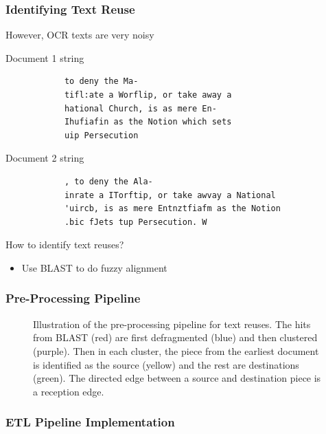 \documentclass[pdf]{beamer}
\begin{document}
\begin{frame}[fragile]
    \frametitle{Identifying Text Reuse}


        However, OCR texts are very noisy
        \begin{block}{\centering Document 1 string}
            \footnotesize
            \begin{verbatim}
            to deny the Ma-
            tifl:ate a Worflip, or take away a
            hational Church, is as mere En-
            Ihufiafin as the Notion which sets
            uip Persecution    
            \end{verbatim}
        \end{block}    
        \begin{block}{\centering Document 2 string}
            \footnotesize
            \begin{verbatim}
            , to deny the Ala-
            inrate a ITorftip, or take awvay a National
            'uircb, is as mere Entnztfiafm as the Notion
            .bic fJets tup Persecution. W
            \end{verbatim}
        \end{block}    
        How to identify text reuses?
        \begin{itemize}
            \item Use BLAST to do fuzzy alignment
        \end{itemize}
\end{frame}

\begin{frame}[fragile]
    \frametitle{Pre-Processing Pipeline}
    \begin{figure}[htbp]
        \centering
        \scalebox{0.5}{
        
        }
        \caption{Illustration of the pre-processing pipeline for text reuses. The hits from BLAST (red) are first defragmented (blue) and then clustered (purple). Then in each cluster, the piece from the earliest document is identified as the source (yellow) and the rest are destinations (green). The directed edge between a source and destination piece is a reception edge.}
    \end{figure}
\end{frame}

\begin{frame}
    \frametitle{ETL Pipeline Implementation}
    

\end{frame}
\end{document}
